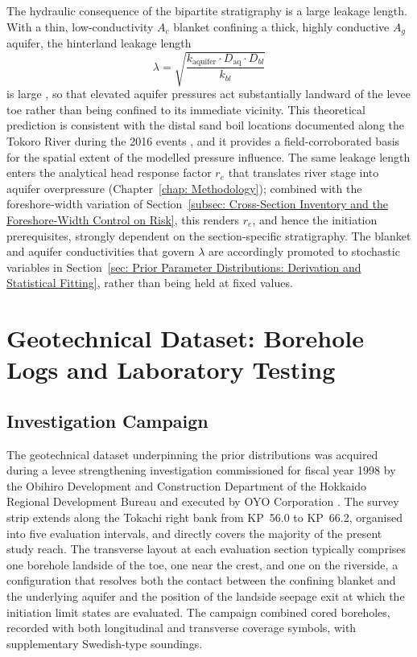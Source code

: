 The hydraulic consequence of the bipartite stratigraphy is a large leakage length. With a thin, low-conductivity $A_c$ blanket confining a thick, highly conductive $A_g$ aquifer, the hinterland leakage length
\begin{equation}
\lambda = \sqrt{\frac{k_\mathrm{aquifer}\cdot D_\mathrm{aq}\cdot D_{bl}}{k_{bl}}}
\end{equation}
is large \parencite{bezuijen_2017}, so that elevated aquifer pressures act substantially landward of the levee toe rather than being confined to its immediate vicinity. This theoretical prediction is consistent with the distal sand boil locations documented along the Tokoro River during the 2016 events \parencite{kawajiri_2025}, and it provides a field-corroborated basis for the spatial extent of the modelled pressure influence. The same leakage length enters the analytical head response factor $r_e$ that translates river stage into aquifer overpressure (Chapter~\ref{chap: Methodology}); combined with the foreshore-width variation of Section~\ref{subsec: Cross-Section Inventory and the Foreshore-Width Control on Risk}, this renders $r_e$, and hence the initiation prerequisites, strongly dependent on the section-specific stratigraphy. The blanket and aquifer conductivities that govern $\lambda$ are accordingly promoted to stochastic variables in Section~\ref{sec: Prior Parameter Distributions: Derivation and Statistical Fitting}, rather than being held at fixed values.

\section{Geotechnical Dataset: Borehole Logs and Laboratory Testing}
\label{sec: Geotechnical Dataset: Borehole Logs and Laboratory Testing}

\subsection{Investigation Campaign}
\label{subsec: Investigation Campaign}

The geotechnical dataset underpinning the prior distributions was acquired during a levee strengthening investigation commissioned for fiscal year 1998 by the Obihiro Development and Construction Department of the Hokkaido Regional Development Bureau and executed by OYO Corporation \parencite{oyo_1999}. The survey strip extends along the Tokachi right bank from KP~56.0 to KP~66.2, organised into five evaluation intervals, and directly covers the majority of the present study reach. The transverse layout at each evaluation section typically comprises one borehole landside of the toe, one near the crest, and one on the riverside, a configuration that resolves both the contact between the confining blanket and the underlying aquifer and the position of the landside seepage exit at which the initiation limit states are evaluated. The campaign combined cored boreholes, recorded with both longitudinal and transverse coverage symbols, with supplementary Swedish-type soundings.

